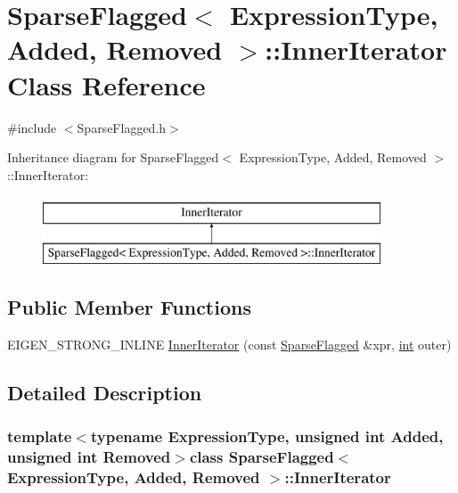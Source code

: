 \hypertarget{class_sparse_flagged_1_1_inner_iterator}{\section{Sparse\-Flagged$<$ Expression\-Type, Added, Removed $>$\-:\-:Inner\-Iterator Class Reference}
\label{class_sparse_flagged_1_1_inner_iterator}
}


{\ttfamily \#include $<$Sparse\-Flagged.\-h$>$}

Inheritance diagram for Sparse\-Flagged$<$ Expression\-Type, Added, Removed $>$\-:\-:Inner\-Iterator\-:\begin{figure}[H]
\begin{center}
\leavevmode
\includegraphics[height=2.000000cm]{class_sparse_flagged_1_1_inner_iterator}
\end{center}
\end{figure}
\subsection*{Public Member Functions}
\begin{DoxyCompactItemize}
\item 
E\-I\-G\-E\-N\-\_\-\-S\-T\-R\-O\-N\-G\-\_\-\-I\-N\-L\-I\-N\-E \hyperlink{class_sparse_flagged_1_1_inner_iterator_a19b17b426e99493b10eccdb2e7da6d96}{Inner\-Iterator} (const \hyperlink{class_sparse_flagged}{Sparse\-Flagged} \&xpr, \hyperlink{ioapi_8h_a787fa3cf048117ba7123753c1e74fcd6}{int} outer)
\end{DoxyCompactItemize}


\subsection{Detailed Description}
\subsubsection*{template$<$typename Expression\-Type, unsigned int Added, unsigned int Removed$>$class Sparse\-Flagged$<$ Expression\-Type, Added, Removed $>$\-::\-Inner\-Iterator}



